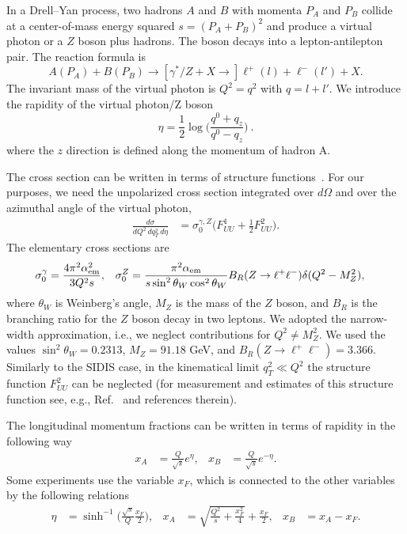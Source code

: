 \documentclass[aps,preprintnumbers,showpacs,nofootinbib,superscriptaddress,floatfix]{revtex4}
\begin{document}
In a Drell--Yan process, two hadrons $A$ and $B$ with momenta $P_A$ and $P_B$
collide at a center-of-mass energy squared $s = (P_A + P_B)^2$ 
and produce a virtual photon or a $Z$ boson plus hadrons. 
The boson decays into a
lepton-antilepton pair. The reaction formula is
\begin{equation}
A(P_A)+B(P_B)\to [\gamma^*/Z + X \to] \ell^+(l) + \ell^-(l') + X.
\end{equation} 
The invariant mass of the virtual photon is $Q^2=q^2$ with $q = l + l'$. 
We introduce the rapidity of the virtual photon/Z boson
\begin{equation}
\eta=\frac{1}{2}\log\bigg(\frac{q^0+q_z}{q^0-q_z}\bigg)\  .
\end{equation} 
where the $z$ direction is defined along the momentum of hadron A.

The cross section can be written in terms of structure
functions~\cite{Boer:2006eq,Arnold:2008kf}. For our purposes, we need the unpolarized 
cross section
integrated over $d\Omega$ and over the azimuthal angle of the virtual photon, 
\begin{align}
\label{e:dsigma_gZ}
\frac{d\sigma}{dQ^2\, dq_T^2\,d\eta} &= \sigma_0^{\gamma,Z}
\bigg(F_{UU}^1 + \frac{1}{2} F_{UU}^2\bigg). 
\end{align} 
The elementary cross sections are
\begin{align}
\sigma_0^{\gamma} &= \frac{4\pi^2 \alpha^2_{\rm em}}{3 Q^2 s},
&
\sigma_0^Z &= 
\frac{\pi^2 \alpha_{\rm em}}{s \sin^2{\theta_W} \cos^2{\theta_W}}
B_R(Z\rightarrow \ell^+\ell^-)
\delta(Q^2 - M_Z^2), 
\label{e:elem_cs_sig0}
\end{align} 
where $\theta_W$ is Weinberg's angle, $M_Z$ is the mass of the $Z$ boson, and
$B_R$ is the branching ratio for the $Z$ boson decay in two leptons.
We adopted the narrow-width approximation, i.e., we neglect contributions for 
$Q^2 \neq M_Z^2$. 
We used the values 
$\sin^2 \theta_W= 0.2313$, $M_Z = 91.18$ GeV, and 
$B_R(Z\rightarrow \ell^+\ell^-)=3.366$.  
Similarly to the SIDIS case, in the kinematical limit $q_T^2 \ll Q^2$ 
the structure function $F_{UU}^2$ can be neglected 
(for measurement and estimates of this
structure function see, e.g.,
Ref.~\cite{Lambertsen:2016wgj} and references therein). 

The longitudinal momentum fractions can be written in terms of
rapidity in the following way 
\begin{align}
x_A &= \frac{Q}{\sqrt{s}} e^{\eta},
&
x_B &= \frac{Q}{\sqrt{s}} e^{-\eta}.
\label{xab}
\end{align} 
Some experiments use the variable $x_F$, which is connected to the other
variables  by the following relations
\begin{align}
\label{e:eta_xf}
\eta &= \sinh^{-1}\bigg(\frac{\sqrt{s}}{Q}\frac{x_F}{2}\bigg),
& 
x_{A} &= \sqrt{\frac{Q^2}{s} + \frac{x_F^2}{4}} + \frac{x_F}{2},
&
x_B &= x_A - x_F.  
\end{align} 
\end{document}
